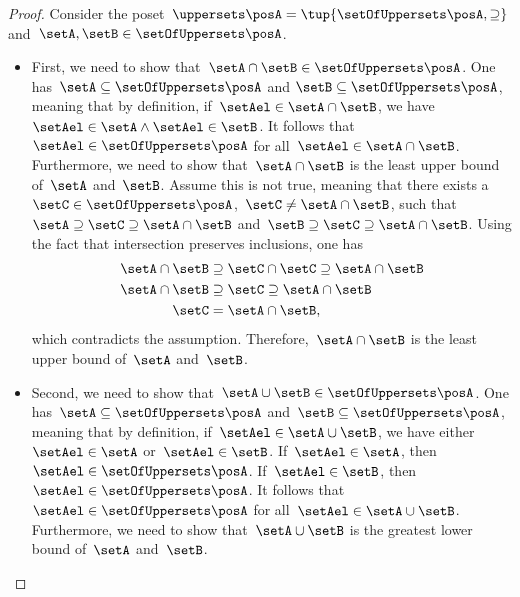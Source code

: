 \begin{proof}
    Consider the poset~$\uppersets \posA=\tup{\setOfUppersets \posA,\supseteq}$ and~$\setA,\setB\in \setOfUppersets \posA$.
    \begin{itemize}
        \item First, we need to show that~$\setA\cap \setB\in \setOfUppersets \posA$.
              One has~$\setA \subseteq \setOfUppersets \posA$ and $\setB\subseteq \setOfUppersets \posA$, meaning that by definition, if~$\setAel\in \setA\cap \setB$, we have~$\setAel \in \setA \wedge \setAel \in \setB$.
              It follows that~$\setAel \in \setOfUppersets \posA$ for all~$\setAel \in \setA\cap \setB$.
              Furthermore, we need to show that~$\setA\cap \setB$ is the least upper bound of~$\setA$ and~$\setB$.
              Assume this is not true, meaning that there exists a~$\setC\in \setOfUppersets \posA$,~$\setC\neq \setA\cap \setB$, such that~$\setA\supseteq \setC\supseteq \setA\cap \setB$ and~$\setB\supseteq \setC\supseteq \setA\cap \setB$.
              Using the fact that intersection preserves inclusions, one has
              \begin{equation}
                  \begin{aligned}
                      \setA\cap \setB & \supseteq \setC\cap \setC \supseteq \setA\cap \setB \\
                      \setA\cap \setB & \supseteq \setC \supseteq \setA\cap \setB           \\
                      \setC           & = \setA\cap \setB,
                  \end{aligned}
              \end{equation}
              which contradicts the assumption.
              Therefore,~$\setA\cap \setB$ is the least upper bound of~$\setA$ and~$\setB$.
        \item Second, we need to show that~$\setA\cup \setB\in \setOfUppersets \posA$.
              One has~$\setA\subseteq \setOfUppersets \posA$ and~$\setB\subseteq \setOfUppersets \posA$, meaning that by definition, if~$\setAel\in \setA\cup \setB$, we have either~$\setAel\in \setA$ or~$\setAel\in \setB$.
              If~$\setAel\in \setA$, then~$\setAel\in \setOfUppersets \posA$.
              If~$\setAel\in \setB$, then~$\setAel \in \setOfUppersets \posA$.
              It follows that~$\setAel \in \setOfUppersets \posA$ for all~$\setAel\in \setA\cup \setB$.
              Furthermore, we need to show that~$\setA\cup \setB$ is the greatest lower bound of~$\setA$ and~$\setB$.

\end{itemize}
\end{proof}
